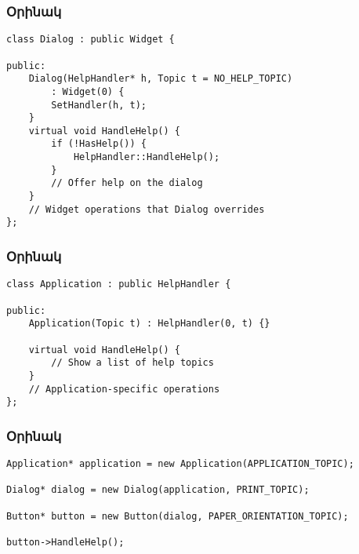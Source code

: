 \documentclass{beamer}
\begin{document}
\begin{frame}[fragile]\frametitle{Օրինակ}
\begin{english}
\begin{verbatim}
class Dialog : public Widget {

public:
    Dialog(HelpHandler* h, Topic t = NO_HELP_TOPIC)
        : Widget(0) {
        SetHandler(h, t);
    }
    virtual void HandleHelp() {
        if (!HasHelp()) {
            HelpHandler::HandleHelp();
        }
        // Offer help on the dialog
    }
    // Widget operations that Dialog overrides
};
\end{verbatim}
\end{english}
\end{frame}

\begin{frame}[fragile]\frametitle{Օրինակ}
\begin{english}
\begin{verbatim}
class Application : public HelpHandler {

public:
    Application(Topic t) : HelpHandler(0, t) {}

    virtual void HandleHelp() {
        // Show a list of help topics
    }
    // Application-specific operations
};
\end{verbatim}
\end{english}
\end{frame}

\begin{frame}[fragile]\frametitle{Օրինակ}
\begin{english}
\begin{verbatim}
Application* application = new Application(APPLICATION_TOPIC);

Dialog* dialog = new Dialog(application, PRINT_TOPIC);

Button* button = new Button(dialog, PAPER_ORIENTATION_TOPIC);

button->HandleHelp();
\end{verbatim}
\end{english}
\end{frame}
\end{document}
